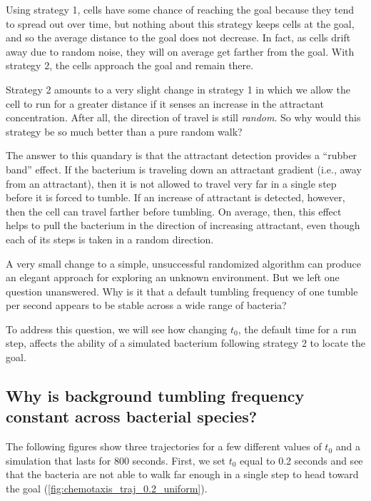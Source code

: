Using strategy 1, cells have some chance of reaching the goal because they tend to spread out over time, but nothing about this strategy keeps cells at the goal, and so the average distance to the goal does not decrease. In fact, as cells drift away due to random noise, they will on average get farther from the goal. With strategy 2, the cells approach the goal and remain there.

Strategy 2 amounts to a very slight change in strategy 1 in which we allow the cell to run for a greater distance if it senses an increase in the attractant concentration. After all, the direction of travel is still \textit{random}. So why would this strategy be so much better than a pure random walk?

The answer to this quandary is that the attractant detection provides a ``rubber band'' effect. If the bacterium is traveling down an attractant gradient (i.e., away from an attractant), then it is not allowed to travel very far in a single step before it is forced to tumble. If an increase of attractant is detected, however, then the cell can travel farther before tumbling. On average, then, this effect helps to pull the bacterium in the direction of increasing attractant, even though each of its steps is taken in a random direction.

A very small change to a simple, unsuccessful randomized algorithm can produce an elegant approach for exploring an unknown environment. But we left one question unanswered. Why is it that a default tumbling frequency of one tumble per second appears to be stable across a wide range of bacteria?

To address this question, we will see how changing $t_0$, the default time for a run step, affects the ability of a simulated bacterium following strategy 2 to locate the goal.


\FloatBarrier
{}
\subsection{Why is background tumbling frequency constant across bacterial species?}


The following figures show three trajectories for a few different values of $t_0$ and a simulation that lasts for 800 seconds. First, we set $t_0$ equal to 0.2 seconds and see that the bacteria are not able to walk far enough in a single step to head toward the goal (\autoref{fig:chemotaxis_traj_0.2_uniform}).

